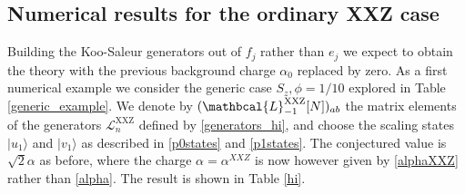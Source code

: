\documentclass[a4paper,10pt]{article}
\newcommand{\q}{\mathfrak{q}}
\newcommand{\linnea}[1]{$\framebox{\tiny L}$\ \textbf{\texttt{{\color{red}\footnotesize#1}}}}
\newcommand{\aSt}{\mathcal{W}}
\newcommand{\AStTL}[2]{\aSt_{#1,#2}}
\newcommand{\bAStTL}[2]{\overline{\mathcal{W}}_{#1,#2}}
\newcommand{\KSgen}{\mathcal{L}}
\newcommand{\LnMatXXZ}[1]{\mathbcal{L}^{\rm XXZ}_{#1}}
\begin{document}



\FloatBarrier

\subsection{Numerical results for the ordinary XXZ case}


Building the Koo-Saleur generators out of $f_j$ rather than $e_j$ we expect to obtain the theory with the previous background charge $\alpha_0$ replaced by zero. As a first numerical example we consider the generic case $S_z,\phi=1/10$ explored in Table \ref{generic_example}. We denote by $(\LnMatXXZ{-1}[N])_{ab}$ the matrix elements of the generators $\KSgen_n^{\text{XXZ}}$ defined by \eqref{generators_hi}, and choose the scaling states $|u_1\rangle$ and $|v_1\rangle$ as described in \eqref{p0states} and \eqref{p1states}. The conjectured value is $\sqrt{2}\alpha$ as before, where the charge $\alpha=\alpha^{XXZ}$ is now however given by \eqref{alphaXXZ} rather than \eqref{alpha}. %
The result is shown in Table \ref{hi}.
\end{document}
